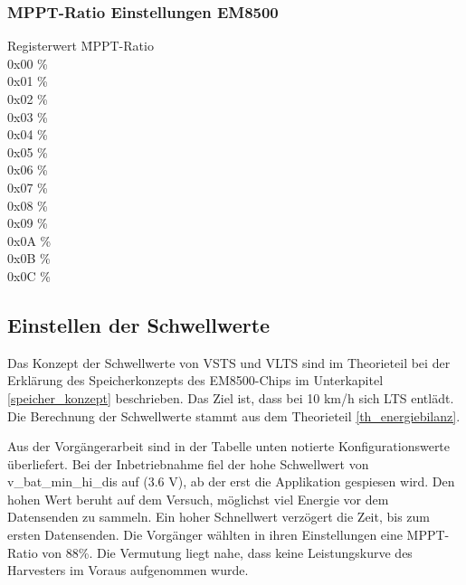 \subsubsection*{MPPT-Ratio Einstellungen EM8500}
\begin{tabbing}
    Registerwert   \quad\= MPPT-Ratio    \\[0.8ex]
    0x00           \thinspace\% \\
    0x01           \thinspace\%\\
    0x02           \thinspace\%\\
    0x03           \thinspace\%\\
    0x04           \thinspace\%\\
    0x05           \thinspace\%\\
    0x06           \thinspace\% \\
    0x07           \thinspace\%\\
    0x08           \thinspace\%\\
    0x09           \thinspace\%\\
    0x0A           \thinspace\% \\
    0x0B           \thinspace\%\\
    0x0C           \thinspace\%\\
\end{tabbing}





\subsection{Einstellen der Schwellwerte}
\label{v_schwellwerte}

Das Konzept der Schwellwerte von VSTS und VLTS sind im Theorieteil bei der Erklärung des Speicherkonzepts des EM8500-Chips im Unterkapitel \ref{speicher_konzept} beschrieben. Das Ziel ist, dass bei 10 km/h sich LTS entlädt. Die Berechnung der Schwellwerte stammt aus dem Theorieteil \ref{th_energiebilanz}.


Aus der Vorgängerarbeit sind in der Tabelle unten notierte Konfigurationswerte überliefert. Bei der Inbetriebnahme fiel der hohe Schwellwert von v\_bat\_min\_hi\_dis auf (3.6 V), ab der erst die Applikation gespiesen wird. Den hohen Wert beruht auf dem Versuch, möglichst viel Energie vor dem Datensenden zu sammeln. Ein hoher Schnellwert verzögert die Zeit, bis zum ersten Datensenden. Die Vorgänger wählten in ihren Einstellungen eine MPPT-Ratio von 88\thinspace\%. Die Vermutung liegt nahe, dass keine Leistungskurve des Harvesters im Voraus aufgenommen wurde.

